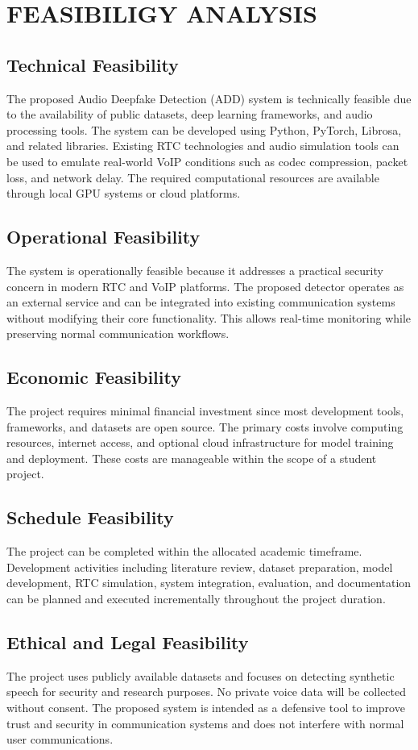 \newpage
\section{FEASIBILIGY ANALYSIS}

\subsection{Technical Feasibility}
The proposed Audio Deepfake Detection (ADD) system is technically feasible due to the availability of public datasets, deep learning frameworks, and audio processing tools. The system can be developed using Python, PyTorch, Librosa, and related libraries. Existing RTC technologies and audio simulation tools can be used to emulate real-world VoIP conditions such as codec compression, packet loss, and network delay. The required computational resources are available through local GPU systems or cloud platforms.

\subsection{Operational Feasibility}
The system is operationally feasible because it addresses a practical security concern in modern RTC and VoIP platforms. The proposed detector operates as an external service and can be integrated into existing communication systems without modifying their core functionality. This allows real-time monitoring while preserving normal communication workflows.

\subsection{Economic Feasibility}
The project requires minimal financial investment since most development tools, frameworks, and datasets are open source. The primary costs involve computing resources, internet access, and optional cloud infrastructure for model training and deployment. These costs are manageable within the scope of a student project.

\subsection{Schedule Feasibility}
The project can be completed within the allocated academic timeframe. Development activities including literature review, dataset preparation, model development, RTC simulation, system integration, evaluation, and documentation can be planned and executed incrementally throughout the project duration.

\subsection{Ethical and Legal Feasibility}
The project uses publicly available datasets and focuses on detecting synthetic speech for security and research purposes. No private voice data will be collected without consent. The proposed system is intended as a defensive tool to improve trust and security in communication systems and does not interfere with normal user communications.